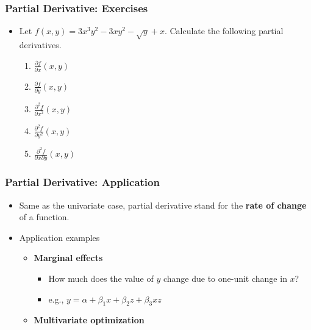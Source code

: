 \documentclass[pdflatex, 12pt]{beamer}
\begin{document}
\begin{frame}
\frametitle{Partial Derivative: Exercises}
\begin{itemize}
\item Let $f(x, y) = 3x^3y^2 - 3xy^2 - \sqrt{y} + x$. Calculate the following partial derivatives.
 \begin{enumerate}
 \item $\frac{\partial f}{\partial x} (x, y)$
 \vspace{0.1cm}
 \item $\frac{\partial f}{\partial y} (x, y)$
 \vspace{0.1cm}
 \item $\frac{\partial^2 f}{\partial x^2} (x, y)$
 \vspace{0.1cm}
 \item $\frac{\partial^2 f}{\partial y^2} (x, y)$
 \vspace{0.1cm}
 \item $\frac{\partial^2 f}{\partial x \partial y} (x, y)$
 \end{enumerate}
\end{itemize}
\end{frame}

\begin{frame}
\frametitle{Partial Derivative: Application}
\begin{itemize}
\item Same as the univariate case, partial derivative stand for the \textbf{rate of change} of a function.
\vspace{0.4cm}
\item Application examples
 \begin{itemize}
 \item \textbf{Marginal effects}
  \begin{itemize}
  \item How much does the value of $y$ change due to one-unit change in $x$?
  \item e.g., $y = \alpha + \beta_1 x + \beta_2 z + \beta_3 xz$  
  \end{itemize}
 \item \textbf{Multivariate optimization}
 \end{itemize} 
\end{itemize}
\end{frame}
\end{document}
